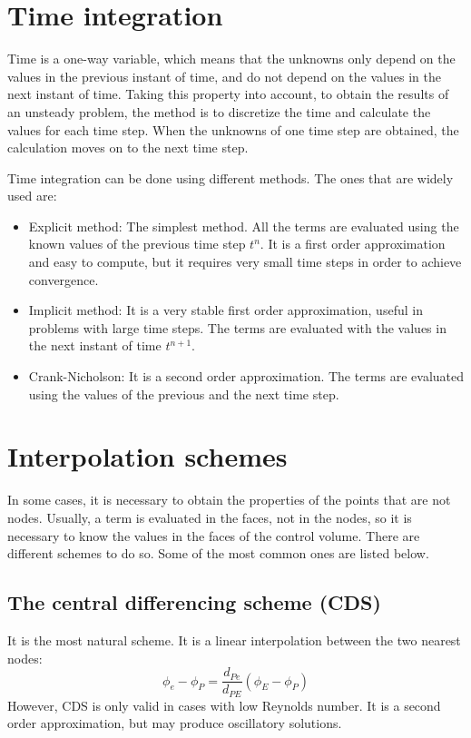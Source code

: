\section{Time integration}
\label{TimeIntegration}
Time is a one-way variable, which means that the unknowns only depend on the values in the previous instant of time, and do not depend on the values in the next instant of time. Taking this property into account, to obtain the results of an unsteady problem, the method is to discretize the time and calculate the values for each time step. When the unknowns of one time step are obtained, the calculation moves on to the next time step.

Time integration can be done using different methods. The ones that are widely used are:
\begin{itemize}
	\item Explicit method: The simplest method. All the terms are evaluated using the known values of the previous time step $t^{n}$. It is a first order approximation and easy to compute, but it requires very small time steps in order to achieve convergence.
	\item Implicit method: It is a very stable first order approximation, useful in problems with large time steps. The terms are evaluated with the values in the next instant of time $t^{n+1}$.
	\item Crank-Nicholson: It is a second order approximation. The terms are evaluated using the values of the previous and the next time step.
\end{itemize}

\section{Interpolation schemes}
In some cases, it is necessary to obtain the properties of the points that are not nodes. Usually, a term is evaluated in the faces, not in the nodes, so it is necessary to know the values in the faces of the control volume. There are different schemes to do so.  Some of the most common ones are listed below\cite{Patankar1980,Ferziger2002}.

\subsection{The central differencing scheme (CDS)}
It is the most natural scheme. It is a linear interpolation between the two nearest nodes:
\begin{equation}
\phi_{e}-\phi_{P}=\frac{d_{Pe}}{d_{PE}}\left(\phi_{E}-\phi_{P}\right)
\end{equation}
However, CDS is only valid in cases with low Reynolds number. It is a second order approximation, but may produce oscillatory solutions.

